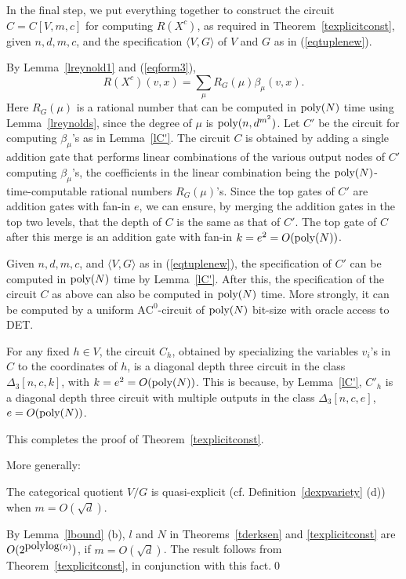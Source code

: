 \documentclass[11pt]{article}
\begin{document}
In the final step, we put everything together
to construct the circuit $C=C[V,m,c]$ 
for computing $R(X^c)$, as required in Theorem~\ref{texplicitconst}, 
given $n,d,m,c$, and the specification $\langle V, G \rangle$ of $V$ and $G$
as in (\ref{eqtuplenew}).


By Lemma~\ref{lreynold1} and (\ref{eqform3}),
\[R(X^c)(v, x)= \sum_\mu R_G(\mu) \beta_\mu(v, x).\]
Here $R_G(\mu)$ is a rational number that can be computed in ${\mbox {poly}}(N)$ time using 
Lemma~\ref{lreynolds}, since the  degree of  $\mu$ is  ${\mbox {poly}}(n,d^{m^2})$. 
Let $C'$ be the circuit for computing $\beta_\mu$'s as in Lemma~\ref{lC'}.
The circuit $C$ is obtained by adding a single  addition gate that
performs linear combinations of the various output nodes 
of $C'$ computing $\beta_\mu$'s, the coefficients in the linear combination being the ${\mbox {poly}}(N)$-time-computable rational numbers  
$R_G(\mu)$'s.
Since the top gates of $C'$ are addition gates with fan-in $e$, 
we can ensure, by merging the  addition gates in the top two levels,
that the depth of $C$ is the same as that of $C'$. 
The top gate of $C$ after this merge is an addition gate with fan-in $k=e^2=O({\mbox {poly}}(N))$.

Given $n,d,m,c$, and $\langle V, G \rangle$ as in (\ref{eqtuplenew}), 
the specification of $C'$ can be computed in ${\mbox {poly}}(N)$ time by  Lemma~\ref{lC'}.
After this, the specification of the circuit $C$  as above 
can also be computed in ${\mbox {poly}}(N)$ time. More strongly, it can be computed by a uniform $\mbox{AC}^0$-circuit of 
${\mbox {poly}}(N)$ bit-size with oracle access to DET.

For  any fixed 
$h \in V$, the circuit $C_h$, obtained by specializing the variables $v_i$'s  in $C$ 
to the coordinates of $h$, is 
a diagonal depth three circuit in the class $\Delta_3[n,c,k]$, with $k=e^2=O({\mbox {poly}}(N))$.
This is because, by Lemma~\ref{lC'}, 
$C'_h$  is a diagonal depth three circuit with multiple outputs 
in the class $\Delta_3[n,c,e]$, $e=O({\mbox {poly}}(N))$.

This completes the proof of Theorem~\ref{texplicitconst}. 

More generally:

\begin{theorem} \label{tquasiexplicit}
The categorical quotient $V/G$ is quasi-explicit (cf. Definition~\ref{dexpvariety} (d))
when $m=O(\sqrt{d})$.
\end{theorem}
\proof 
By  Lemma~\ref{lbound} (b),
$l$ and $N$ in Theorems~\ref{tderksen} and \ref{texplicitconst} are  $O(2^{{\mbox {polylog}}(n)})$,
if $m=O(\sqrt{d})$. The result follows from Theorem~\ref{texplicitconst}, in conjunction with 
this fact.\qed 
\end{document}
